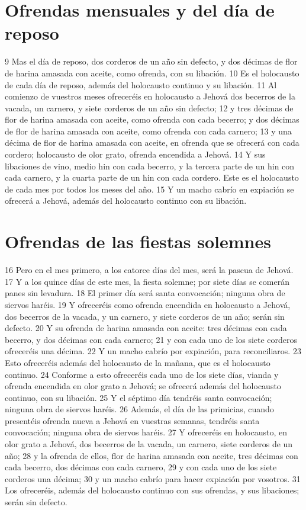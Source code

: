 \section*{Ofrendas mensuales y del día de reposo}

9 Mas el día de reposo, dos corderos de un año sin defecto, y dos décimas de flor de harina amasada con aceite, como ofrenda, con su libación.
10 Es el holocausto de cada día de reposo, además del holocausto continuo y su libación.
11 Al comienzo de vuestros meses ofreceréis en holocausto a Jehová dos becerros de la vacada, un carnero, y siete corderos de un año sin defecto;
12 y tres décimas de flor de harina amasada con aceite, como ofrenda con cada becerro; y dos décimas de flor de harina amasada con aceite, como ofrenda con cada carnero;
13 y una décima de flor de harina amasada con aceite, en ofrenda que se ofrecerá con cada cordero; holocausto de olor grato, ofrenda encendida a Jehová.
14 Y sus libaciones de vino, medio hin   con cada becerro, y la tercera parte de un hin con cada carnero, y la cuarta parte de un hin con cada cordero. Este es el holocausto de cada mes por todos los meses del año.
15 Y un macho cabrío en expiación se ofrecerá a Jehová, además del holocausto continuo con su libación.

\section*{Ofrendas de las fiestas solemnes}

16 Pero en el mes primero, a los catorce días del mes, será la pascua de Jehová.
17 Y a los quince días de este mes, la fiesta solemne; por siete días se comerán panes sin levadura. 
18 El primer día será santa convocación; ninguna obra de siervos haréis.
19 Y ofreceréis como ofrenda encendida en holocausto a Jehová, dos becerros de la vacada, y un carnero, y siete corderos de un año; serán sin defecto.
20 Y su ofrenda de harina amasada con aceite: tres décimas con cada becerro, y dos décimas con cada carnero;
21 y con cada uno de los siete corderos ofreceréis una décima.
22 Y un macho cabrío por expiación, para reconciliaros.
23 Esto ofreceréis además del holocausto de la mañana, que es el holocausto continuo.
24 Conforme a esto ofreceréis cada uno de los siete días, vianda y ofrenda encendida en olor grato a Jehová; se ofrecerá además del holocausto continuo, con su libación.
25 Y el séptimo día tendréis santa convocación; ninguna obra de siervos haréis.
26 Además, el día de las primicias, cuando presentéis ofrenda nueva a Jehová en vuestras semanas, tendréis santa convocación; ninguna obra de siervos haréis.
27 Y ofreceréis en holocausto, en olor grato a Jehová, dos becerros de la vacada, un carnero, siete corderos de un año;
28 y la ofrenda de ellos, flor de harina amasada con aceite, tres décimas con cada becerro, dos décimas con cada carnero,
29 y con cada uno de los siete corderos una décima;
30 y un macho cabrío para hacer expiación por vosotros.
31 Los ofreceréis, además del holocausto continuo con sus ofrendas, y sus libaciones; serán sin defecto.

